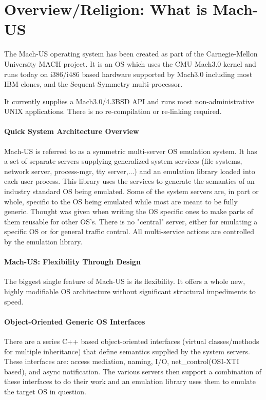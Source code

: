 \section{Overview/Religion: What is Mach-US}
The Mach-US operating system has been created
as part of the Carnegie-Mellon University MACH project.
It is an OS which uses the CMU Mach3.0 kernel
and runs today on i386/i486 based hardware supported by Mach3.0 including
most IBM clones, and the Sequent Symmetry multi-processor.

It currently supplies a Mach3.0/4.3BSD API and runs
most non-administrative UNIX applications.
There is no re-compilation or re-linking required.

\paragraph{Quick System Architecture Overview}
Mach-US is referred to
as a symmetric multi-server OS emulation system.
It has a set of separate servers
supplying generalized system services (file systems, network server,
process-mgr, tty server,...) and an emulation library loaded
into each user process.  This library uses the services
to generate the semantics
of an industry standard OS being emulated.  Some of the system servers are,
in part
or whole, specific to the OS being emulated while most are meant to
be fully generic.  Thought was given when writing the OS specific ones to
make parts of them reusable for other OS's.  There is no "central" server,
either for emulating a specific OS or for general traffic control.
All multi-service actions are controlled by the emulation library.

\paragraph{Mach-US: Flexibility Through Design}
The biggest single feature of Mach-US is its flexibility.  It offers a whole
new, highly modifiable OS architecture without significant
structural impediments to speed.

\paragraph{Object-Oriented Generic OS Interfaces}
There are a series C++ based object-oriented
interfaces (virtual classes/methods for multiple inheritance)
that define semantics supplied by the
system servers.  These interfaces are: access mediation, naming, I/O, 
net\_control(OSI-XTI based), and async notification.  The various servers then
support a
combination of these interfaces to do their work and an emulation library uses
them to emulate the target OS in question.

